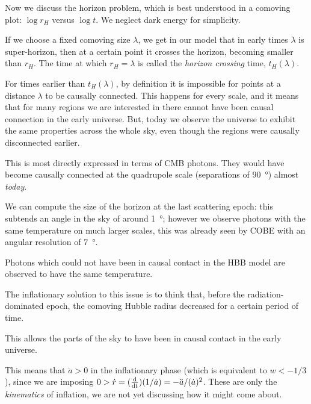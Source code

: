 \documentclass[main.tex]{subfiles}
\begin{document}
Now we discuss the horizon problem, which is best understood in a comoving plot: \(\log r_H \) versus \(\log t\). We neglect dark energy for simplicity.

If we choose a fixed comoving size \(\lambda \), we get in our model that in early times \(\lambda \) is super-horizon, then at a certain point it crosses the horizon, becoming smaller than \(r_H \). The time at which \(r_H = \lambda \) is called the \emph{horizon crossing} time, \(t_H (\lambda )\). 

For times earlier than \(t_H (\lambda )\), by definition it is impossible for points at a distance \(\lambda \) to be causally connected. 
This happens for every scale, and it means that for many regions we are interested in there cannot have been causal connection in the early universe. 
But, today we observe the universe to exhibit the same properties across the whole sky, even though the regions were causally disconnected earlier. 

This is most directly expressed in terms of CMB photons. They would have become causally connected at the quadrupole scale (separations of \SI{90}{\degree}) almost \emph{today}. 

We can compute the size of the horizon at the last scattering epoch: this subtends an angle in the sky of around \SI{1}{\degree}; however we observe photons with the same temperature on much larger scales, this was already seen by COBE with an angular resolution of \SI{7}{\degree}. 


Photons which could not have been in causal contact in the HBB model are observed to have the same temperature. 

The inflationary solution to this issue is to think that, before the radiation-dominated epoch, the comoving Hubble radius decreased for a certain period of time.

This allows the parts of the sky to have been in causal contact in the early universe. 

This means that \(\ddot{a} > 0\) in the inflationary phase (which is equivalent to \(w < - 1/3\)), since we are imposing \(0 > \dot{r} = (\dv{}{t})(1/ \dot{a}) = - \ddot{a} / (\dot{a})^2\).
These are only the \emph{kinematics} of inflation, we are not yet discussing how it might come about. 
\end{document}
